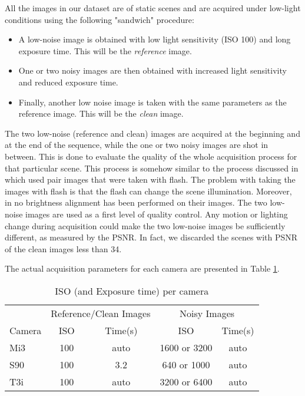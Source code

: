 \documentclass[review]{elsarticle}
\begin{document}
 All the images in our dataset are of static scenes and are acquired under low-light  conditions using the following "sandwich" procedure:
\begin{itemize}
\item A low-noise image is obtained with low light sensitivity (ISO 100) and long exposure time. This will be the {\em reference} image.
\item One or two noisy images are then obtained with increased light sensitivity and reduced exposure time. 
\item Finally, another low noise image is taken with the same parameters as the reference image.  This will be the {\em clean} image.
\end{itemize}

The two low-noise (reference and clean) images are acquired at the beginning and at the end of the sequence, while the one or two noisy images are shot in between. This is done to evaluate the quality of the whole acquisition process for that particular scene. This process is somehow similar to the process discussed in \cite{NoiseEstimation} which used pair images that were taken with flash. The problem with taking the images with flash is that the flash can change the scene illumination. Moreover, in  \cite{NoiseEstimation} no brightness alignment has been performed on their images. 
The two low-noise images are used as a first level of quality control. Any motion or lighting change during acquisition could make the two low-noise images be sufficiently different, as measured by the PSNR. In fact, we discarded the scenes with PSNR of the clean images less than 34.

The actual acquisition parameters for each camera are presented in Table \ref{tab:camerainfo}.
\begin{table}[htb]
\vspace{-4mm}
\caption{ISO (and Exposure time) per camera \label{tab:camerainfo}}
\vskip -0mm
\centering
\begin{tabular}{|l |c c|c c|}
\hline	
&\multicolumn{2}{c}{ Reference/Clean Images }	&\multicolumn{2}{|c|}{Noisy Images}\\
Camera & ISO &Time(s) & ISO &Time(s)\\
\hline
Mi3\phantom{}		&100  &auto	&1600 or 3200  &auto	\\
S90		&100 &3.2	&640 or 1000 &auto	\\
T3i 		&100 &auto	&3200 or 6400 &auto	\\
\hline
\end{tabular}
\vspace{-4mm}
\end{table}
\end{document}
